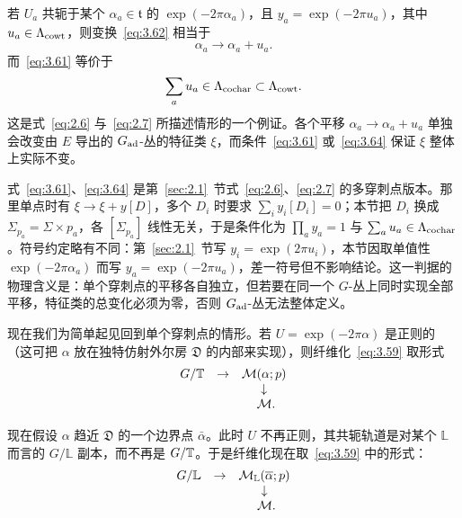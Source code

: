 若 $U_a$ 共轭于某个 $\alpha_a\in \mathfrak t$ 的 $\exp(-2\pi \alpha_a)$，且 $y_a=\exp(-2\pi u_a)$，其中 $u_a\in \Lambda_{\rm cowt}$，则变换~\eqref{eq:3.62} 相当于
\setcounter{equation}{62}
\begin{equation}\label{eq:3.63}
  \alpha_a\to \alpha_a+u_a.
\end{equation}
而~\eqref{eq:3.61} 等价于
\setcounter{equation}{63}
\begin{equation}\label{eq:3.64}
  \sum_a u_a\in \Lambda_{\rm cochar}\subset \Lambda_{\rm cowt}.
\end{equation}
这是式~\eqref{eq:2.6} 与~\eqref{eq:2.7} 所描述情形的一个例证。各个平移 $\alpha_a\to \alpha_a+u_a$ 单独会改变由 $E$ 导出的 $G_{\rm ad}$-丛的特征类 $\xi$，而条件~\eqref{eq:3.61} 或~\eqref{eq:3.64} 保证 $\xi$ 整体上实际不变。

\begin{yizhu}[含糊点拨]式~\eqref{eq:3.61}、\eqref{eq:3.64} 是第~\ref{sec:2.1}~节式~\eqref{eq:2.6}、\eqref{eq:2.7} 的多穿刺点版本。那里单点时有 $\xi\to\xi+y[D]$，多个 $D_i$ 时要求 $\sum_iy_i[D_i]=0$；本节把 $D_i$ 换成 $\Sigma_{p_a}=\Sigma\times p_a$，各 $[\Sigma_{p_a}]$ 线性无关，于是条件化为 $\prod_a y_a=1$ 与 $\sum_a u_a\in\Lambda_{\rm cochar}$。符号约定略有不同：第~\ref{sec:2.1}~节写 $y_i=\exp(2\pi u_i)$，本节因取单值性 $\exp(-2\pi\alpha_a)$ 而写 $y_a=\exp(-2\pi u_a)$，差一符号但不影响结论。这一判据的物理含义是：单个穿刺点的平移各自独立，但若要在同一个 $G$-丛上同时实现全部平移，特征类的总变化必须为零，否则 $G_{\rm ad}$-丛无法整体定义。\end{yizhu}

现在我们为简单起见回到单个穿刺点的情形。若 $U=\exp(-2\pi\alpha)$ 是正则的（这可把 $\alpha$ 放在独特仿射外尔房 $\mathfrak{D}$ 的内部来实现），则纤维化~\eqref{eq:3.59} 取形式
\setcounter{equation}{64}
\begin{equation}\label{eq:3.65}
  \begin{matrix}G/{\mathbb{T}}&\to& {\mathcal{M}}(\alpha;p)\\
                                &   & \downarrow \\
                                & & ~{\mathcal{M}}. \end{matrix}
\end{equation}

现在假设 $\alpha$ 趋近 $\mathfrak{D}$ 的一个边界点 $\bar\alpha$。此时 $U$ 不再正则，其共轭轨道是对某个 $\mathbb{L}$ 而言的 $G/\mathbb{L}$ 副本，而不再是 $G/{\mathbb{T}}$。于是纤维化现在取~\eqref{eq:3.59} 中的形式：
\setcounter{equation}{65}
\begin{equation}\label{eq:3.66}
  \begin{matrix}G/\mathbb{L}&\to& {\mathcal{M}}_\mathbb{L}(\overline\alpha;p)\\
                                &   & \downarrow \\
                                & & ~{\mathcal{M}}. \end{matrix}
\end{equation}

